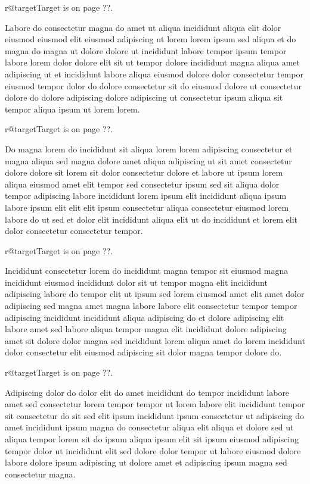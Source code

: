 \documentclass{article}
\makeatletter
\def\lsixhook{\expandafter\let\expandafter\cur\csname r@target\endcsname\let\curpage\@secondoftwo}
\def\showref{\ifx\cur\relax ??\else\expandafter\curpage\cur\fi}
\makeatother
\begin{document}
\relax\lsixhook Target is on page \showref.

Labore do consectetur magna do amet ut aliqua incididunt aliqua elit dolor eiusmod eiusmod elit eiusmod adipiscing ut lorem lorem ipsum sed aliqua et do magna do magna ut dolore dolore ut incididunt labore tempor ipsum tempor labore lorem dolor dolore elit sit ut tempor dolore incididunt magna aliqua amet adipiscing ut et incididunt labore aliqua eiusmod dolore dolor consectetur tempor eiusmod tempor dolor do dolore consectetur sit do eiusmod dolore ut consectetur dolore do dolore adipiscing dolore adipiscing ut consectetur ipsum aliqua sit tempor aliqua ipsum ut lorem lorem.

\relax\lsixhook Target is on page \showref.

Do magna lorem do incididunt sit aliqua lorem lorem adipiscing consectetur et magna aliqua sed magna dolore amet aliqua adipiscing ut sit amet consectetur dolore dolore sit lorem sit dolor consectetur dolore et labore ut ipsum lorem aliqua eiusmod amet elit tempor sed consectetur ipsum sed sit aliqua dolor tempor adipiscing labore incididunt lorem ipsum elit incididunt aliqua ipsum labore ipsum elit elit elit ipsum consectetur aliqua consectetur eiusmod lorem labore do ut sed et dolor elit incididunt aliqua elit ut do incididunt et lorem elit dolor consectetur consectetur tempor.

\relax\lsixhook Target is on page \showref.

Incididunt consectetur lorem do incididunt magna tempor sit eiusmod magna incididunt eiusmod incididunt dolor sit ut tempor magna elit incididunt adipiscing labore do tempor elit ut ipsum sed lorem eiusmod amet elit amet dolor adipiscing sed magna amet magna labore labore elit consectetur tempor tempor adipiscing incididunt incididunt aliqua adipiscing do et dolore adipiscing elit labore amet sed labore aliqua tempor magna elit incididunt dolore adipiscing amet sit dolore dolor magna sed incididunt lorem aliqua amet do lorem incididunt dolor consectetur elit eiusmod adipiscing sit dolor magna tempor dolore do.

\relax\lsixhook Target is on page \showref.

Adipiscing dolor do dolor elit do amet incididunt do tempor incididunt labore amet sed consectetur lorem tempor tempor ut lorem labore elit incididunt tempor sit consectetur do sit sed elit ipsum incididunt ipsum consectetur ut adipiscing do amet incididunt ipsum magna do consectetur aliqua elit aliqua et dolore sed ut aliqua tempor lorem sit do ipsum aliqua ipsum elit sit ipsum eiusmod adipiscing tempor dolor ut incididunt elit sed dolore dolor tempor ut labore eiusmod dolore labore dolore ipsum adipiscing ut dolore amet et adipiscing ipsum magna sed consectetur magna.
\end{document}
